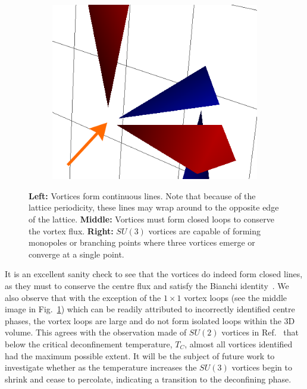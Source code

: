 \begin{figure}[htb!]
\begin{subfigure}[b]{0.3\textwidth}
    \end{subfigure}\hfill
    \begin{subfigure}[b]{0.3\textwidth}
	\includegraphics[width=\textwidth]{./plaqt1_monopole.png}
    \end{subfigure}
    \caption{\label{fig:VortexFeatures} \textbf{Left:} Vortices form continuous lines. Note that because of the lattice periodicity, these lines may wrap around to the opposite edge of the lattice. \textbf{Middle:} Vortices must form closed loops to conserve the vortex flux. \textbf{Right:} $SU(3)$ vortices are capable of forming monopoles or branching points where three vortices emerge or converge at a single point.}
\end{figure}
%
It is an excellent sanity check to see that the vortices do indeed form closed lines, as they must to conserve the centre flux and satisfy the Bianchi identity~\cite{Engelhardt:2003wm,Spengler:2018dxt}. We also observe that with the exception of the $1\times 1$ vortex loops (see the middle image in Fig.~\ref{fig:VortexFeatures}) which can be readily attributed to incorrectly identified centre phases, the vortex loops are large and do not form isolated loops within the 3D volume. This agrees with the observation made of $SU(2)$ vortices in Ref.~\cite{Engelhardt:1999fd} that below the critical deconfinement temperature, $T_C$, almost all vortices identified had the maximum possible extent. It will be the subject of future work to investigate whether as the temperature increases the $SU(3)$ vortices begin to shrink and cease to percolate, indicating a transition to the deconfining phase.\\

